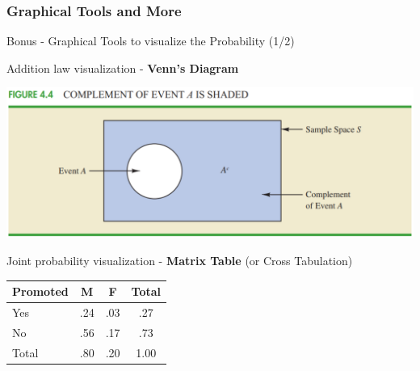 \documentclass{beamer}
\begin{document}
\subsubsection{Graphical Tools and More}

\begin{frame}{Bonus - Graphical Tools to visualize the Probability (1/2)}

\begin{center}
Addition law visualization - \textbf{Venn's Diagram}

\vspace{0.3 cm}

\includegraphics[scale=0.3]{images/ch3VennComplement.png}

\vspace{0.3 cm}

Joint probability visualization - \textbf{Matrix Table} (or Cross Tabulation)

\vspace{0.3 cm}
\begin{tabular}{l|c|c|c}
\hline 
Promoted & M & F & Total \\ 
\hline 
Yes & .24 & .03 & .27 \\ 
\hline 
No & .56 & .17 & .73 \\ 
\hline 
Total & .80 & .20 & 1.00 \\ 
\hline 
\end{tabular}
\end{center}


\end{frame}
\end{document}
